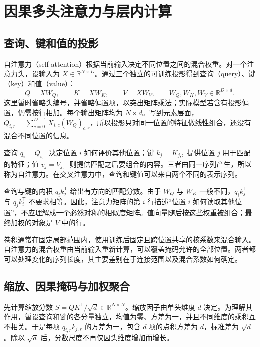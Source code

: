 \section{因果多头注意力与层内计算}
\label{l12:sec:attention}

\subsection{查询、键和值的投影}

自注意力（self-attention）根据当前输入决定不同位置之间的混合权重。对一个注意力头，设输入为 $X\in\mathbb{R}^{N\times D}$。通过三个独立的可训练投影得到查询（query）、键（key）和值（value）：
\begin{equation}
  Q=XW_Q,\qquad K=XW_K,\qquad V=XW_V,
  \qquad W_Q,W_K,W_V\in\mathbb{R}^{D\times d}.
  \label{l12:eq:qkv}
\end{equation}
这里暂时省略头编号，并省略偏置项，以突出矩阵乘法；实际模型若含有投影偏置，仍需按行相加。每个输出矩阵均为 $N\times d$。写到元素层面，$Q_{i,r}=\sum_{c=0}^{D-1}X_{i,c}(W_Q)_{c,r}$，所以投影只对同一位置的特征做线性组合，还没有混合不同位置的信息。

查询 $q_i=Q_{i,:}$ 决定位置 $i$ 如何评价其他位置；键 $k_j=K_{j,:}$ 提供位置 $j$ 用于匹配的特征；值 $v_j=V_{j,:}$ 则提供匹配之后要组合的内容。三者由同一序列产生，所以称为自注意力。在交叉注意力中，查询和键值可以来自两个不同的表示序列。

查询与键的内积 $q_i k_j^{\mathsf T}$ 给出有方向的匹配分数。由于 $W_Q$ 与 $W_K$ 一般不同，$q_i k_j^{\mathsf T}$ 与 $q_j k_i^{\mathsf T}$ 不要求相等。因此，注意力矩阵的第 $i$ 行描述“位置 $i$ 如何读取其他位置”，不应理解成一个必然对称的相似度矩阵。值向量随后按这些权重被组合；最终加权的对象是 $V$ 中的行。

卷积通常在固定局部范围内，使用训练后固定且跨位置共享的核系数来混合输入。自注意力的混合权重由当前输入重新计算，可以覆盖掩码允许的全部位置。两者都可以处理变化的序列长度，其主要差别在于连接范围以及混合系数如何确定。

\subsection{缩放、因果掩码与加权聚合}

先计算缩放分数 $S=QK^{\mathsf T}/\sqrt d\in\mathbb{R}^{N\times N}$。缩放因子由单头维度 $d$ 决定。为理解其作用，暂设查询和键的各分量独立，均值为零、方差为一，并且不同维度的乘积互不相关。于是每项 $q_{i,r}k_{j,r}$ 的方差为一，包含 $d$ 项的点积方差为 $d$，标准差为 $\sqrt d$。除以 $\sqrt d$ 后，分数尺度不再仅因头维度增加而增长。

